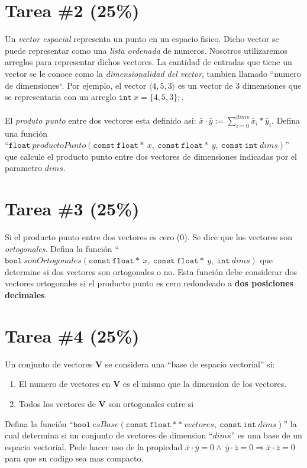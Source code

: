 \documentclass{article}
\begin{document}
\section*{Tarea \#2 (25\%)}

Un \emph{vector espacial} representa un punto en un espacio fisico. Dicho
vector se puede representar como una \emph{lista ordenada} de numeros. Nosotros
utilizaremos arreglos para representar dichos vectores. La cantidad de entradas
que tiene un vector se le conoce como la \emph{dimensionalidad del vector}, tambien
llamado ``numero de dimensiones``. Por ejemplo, el vector $\langle 4,5,3 \rangle$
es un vector de 3 dimensiones que se representaria con un arreglo $\mathtt{int}\ x=\{4,5,3\};$.
\\\\
El \emph{produto punto} entre dos vectores esta definido asi: $\bar x\cdot \bar y:=\sum_{i=0}^{dims}\bar x_i*\bar y_i$. Defina una funci\'on \\``$\mathtt{float}\ productoPunto(\mathtt{const\ float*}\ x,\ \mathtt{const\ float*}\ y,\ \mathtt{const\ int}\ dims)$'' que
calcule el producto punto entre dos vectores de dimensiones indicadas por el
parametro $dims$.

\section*{Tarea \#3 (25\%)}
Si el producto punto entre dos vectores es cero (0). Se dice que los vectores
son \emph{ortogonales}. Defina la funci\'on ``$\mathtt{bool}\ sonOrtogonales(\mathtt{const\ float*}\ x,\ \mathtt{const\ float*}\ y,\ \mathtt{int}\ dims)$ que determine si dos vectores son ortogonales o no. Esta funci\'on debe
considerar dos vectores ortogonales si el producto punto es cero redondeado a
{\bf dos posiciones decimales}.

\section*{Tarea \#4 (25\%)}

Un conjunto de vectores $\mathbf{V}$ se considera una ``base de espacio vectorial''
si:
\begin{enumerate}
    \item{El numero de vectores en $\mathbf{V}$ es el mismo que la dimension
    de los vectores.}
    \item{Todos los vectores de $\mathbf{V}$ son ortogonales entre si}
\end{enumerate}
Defina la funci\'on ``$\mathtt{bool}\ esBase(\mathtt{const\ float**}\ vectores,\ \mathtt{const\ int}\ dims)$'' la cual determina si un conjunto de vectores de
dimension ``$dims$'' es una base de un espacio vectorial. Pede hacer uso de la
propiedad $\bar x\cdot\bar y=0\wedge\ \bar y\cdot\bar z=0\Rightarrow \bar x\cdot\bar z = 0$ para que su codigo sea mas compacto.
\end{document}
